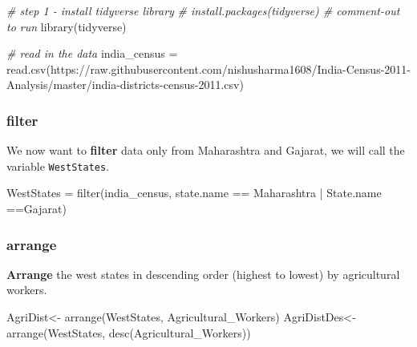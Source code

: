 \documentclass[
]{book}
\newenvironment{Shaded}{\begin{snugshade}}{\end{snugshade}}
\newcommand{\CommentTok}[1]{\textcolor[rgb]{0.56,0.35,0.01}{\textit{#1}}}
\newcommand{\FunctionTok}[1]{\textcolor[rgb]{0.00,0.00,0.00}{#1}}
\newcommand{\NormalTok}[1]{#1}
\newcommand{\OtherTok}[1]{\textcolor[rgb]{0.56,0.35,0.01}{#1}}
\newcommand{\SpecialCharTok}[1]{\textcolor[rgb]{0.00,0.00,0.00}{#1}}
\newcommand{\StringTok}[1]{\textcolor[rgb]{0.31,0.60,0.02}{#1}}
\theoremstyle{definition}
\theoremstyle{definition}
\theoremstyle{definition}
\theoremstyle{definition}
\theoremstyle{remark}
\begin{document}
\begin{Shaded}
\begin{Highlighting}[]
\CommentTok{\# step 1 {-} install tidyverse library}
\CommentTok{\# install.packages(\textquotesingle{}tidyverse\textquotesingle{})  \# comment{-}out to run }
\FunctionTok{library}\NormalTok{(tidyverse)}

\CommentTok{\# read in the data}
\NormalTok{india\_census }\OtherTok{=} \FunctionTok{read.csv}\NormalTok{(}\StringTok{\textquotesingle{}https://raw.githubusercontent.com/nishusharma1608/India{-}Census{-}2011{-}Analysis/master/india{-}districts{-}census{-}2011.csv\textquotesingle{}}\NormalTok{)}
\end{Highlighting}
\end{Shaded}

\hypertarget{filter}{%
\subsubsection{filter}\label{filter}}

We now want to \textbf{filter} data only from Maharashtra and Gajarat, we will call the variable \texttt{WestStates}.

\begin{Shaded}
\begin{Highlighting}[]
\NormalTok{WestStates }\OtherTok{=} \FunctionTok{filter}\NormalTok{(india\_census, state.name }\SpecialCharTok{==} \StringTok{\textquotesingle{}Maharashtra\textquotesingle{}} \SpecialCharTok{|}\NormalTok{ State.name }\SpecialCharTok{==}\StringTok{\textquotesingle{}Gajarat\textquotesingle{}}\NormalTok{) }
\end{Highlighting}
\end{Shaded}

\hypertarget{arrange}{%
\subsubsection{arrange}\label{arrange}}

\textbf{Arrange} the west states in descending order (highest to lowest) by agricultural workers.

\begin{Shaded}
\begin{Highlighting}[]
\NormalTok{AgriDist}\OtherTok{\textless{}{-}} \FunctionTok{arrange}\NormalTok{(WestStates, Agricultural\_Workers)}
\NormalTok{AgriDistDes}\OtherTok{\textless{}{-}} \FunctionTok{arrange}\NormalTok{(WestStates, }\FunctionTok{desc}\NormalTok{(Agricultural\_Workers))}
\end{Highlighting}
\end{Shaded}
\end{document}
